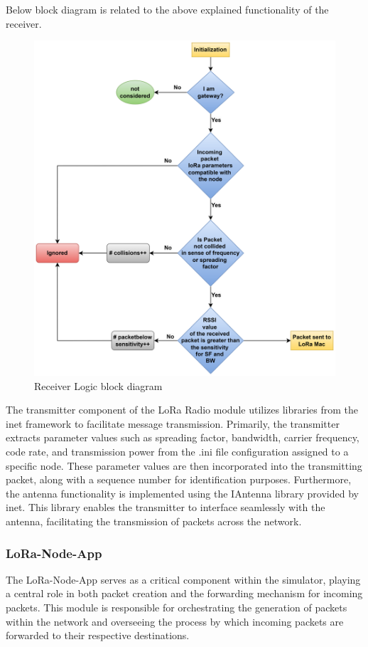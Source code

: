 Below block diagram is related to the above explained functionality of the receiver.\\
            \begin{figure}[h!]
                \centering
                \includegraphics[width=0.8\columnwidth]{images/Parameters.jpg}
                \caption{Receiver Logic block diagram}
                \label{fig:receiver}
            \end{figure}
\newline

The transmitter component of the LoRa Radio module utilizes libraries from the inet framework to facilitate message transmission. Primarily, the transmitter extracts parameter values such as spreading factor, bandwidth, carrier frequency, code rate, and transmission power from the .ini file configuration assigned to a specific node. These parameter values are then incorporated into the transmitting packet, along with a sequence number for identification purposes. Furthermore, the antenna functionality is implemented using the IAntenna library provided by inet. This library enables the transmitter to interface seamlessly with the antenna, facilitating the transmission of packets across the network.

\subsubsection{LoRa-Node-App}
The LoRa-Node-App serves as a critical component within the simulator, playing a central role in both packet creation and the forwarding mechanism for incoming packets. This module is responsible for orchestrating the generation of packets within the network and overseeing the process by which incoming packets are forwarded to their respective destinations.\\

